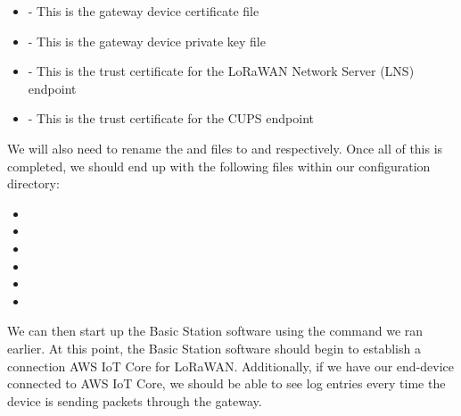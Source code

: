 \begin{itemize}
    \item {} - This is the gateway device certificate file
    \item {} - This is the gateway device private key file
    \item {} - This is the trust certificate for the LoRaWAN Network Server (LNS) endpoint
    \item {} - This is the trust certificate for the CUPS endpoint
\end{itemize}

We will also need to rename the  and  files to  and  respectively. Once all of this is completed, we should end up with the following files within our configuration directory:

\begin{itemize}
    \item {}
    \item {}
    \item {}
    \item {}
    \item {}
    \item {}
\end{itemize}

We can then start up the Basic Station software using the command we ran earlier. At this point, the Basic Station software should begin to establish a connection AWS IoT Core for LoRaWAN. Additionally, if we have our end-device connected to AWS IoT Core, we should be able to see log entries every time the device is sending packets through the gateway.